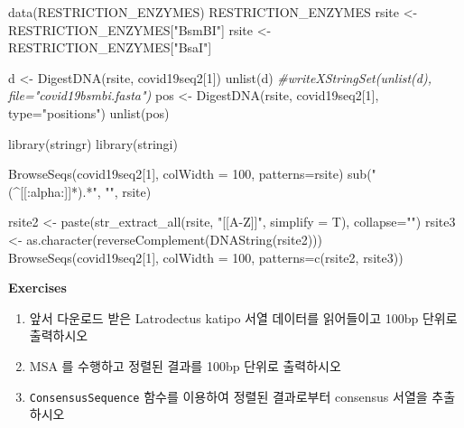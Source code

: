 \documentclass[
]{book}
\newenvironment{Shaded}{\begin{snugshade}}{\end{snugshade}}
\newcommand{\AttributeTok}[1]{\textcolor[rgb]{0.77,0.63,0.00}{#1}}
\newcommand{\CommentTok}[1]{\textcolor[rgb]{0.56,0.35,0.01}{\textit{#1}}}
\newcommand{\DecValTok}[1]{\textcolor[rgb]{0.00,0.00,0.81}{#1}}
\newcommand{\FunctionTok}[1]{\textcolor[rgb]{0.00,0.00,0.00}{#1}}
\newcommand{\NormalTok}[1]{#1}
\newcommand{\OtherTok}[1]{\textcolor[rgb]{0.56,0.35,0.01}{#1}}
\newcommand{\StringTok}[1]{\textcolor[rgb]{0.31,0.60,0.02}{#1}}
\begin{document}
\begin{Shaded}
\begin{Highlighting}[]

\FunctionTok{data}\NormalTok{(RESTRICTION\_ENZYMES)}
\NormalTok{RESTRICTION\_ENZYMES}
\NormalTok{rsite }\OtherTok{\textless{}{-}}\NormalTok{ RESTRICTION\_ENZYMES[}\StringTok{"BsmBI"}\NormalTok{]}
\NormalTok{rsite }\OtherTok{\textless{}{-}}\NormalTok{ RESTRICTION\_ENZYMES[}\StringTok{"BsaI"}\NormalTok{]}

\NormalTok{d }\OtherTok{\textless{}{-}} \FunctionTok{DigestDNA}\NormalTok{(rsite, covid19seq2[}\DecValTok{1}\NormalTok{])}
\FunctionTok{unlist}\NormalTok{(d)}
\CommentTok{\#writeXStringSet(unlist(d), file="covid19bsmbi.fasta")}
\NormalTok{pos }\OtherTok{\textless{}{-}} \FunctionTok{DigestDNA}\NormalTok{(rsite, covid19seq2[}\DecValTok{1}\NormalTok{], }\AttributeTok{type=}\StringTok{"positions"}\NormalTok{)}
\FunctionTok{unlist}\NormalTok{(pos)}


\FunctionTok{library}\NormalTok{(stringr)}
\FunctionTok{library}\NormalTok{(stringi)}


\FunctionTok{BrowseSeqs}\NormalTok{(covid19seq2[}\DecValTok{1}\NormalTok{], }\AttributeTok{colWidth =} \DecValTok{100}\NormalTok{, }\AttributeTok{patterns=}\NormalTok{rsite)}
\FunctionTok{sub}\NormalTok{(}\StringTok{"(\^{}[[:alpha:]]*).*"}\NormalTok{, }\StringTok{""}\NormalTok{, rsite)}

\NormalTok{rsite2 }\OtherTok{\textless{}{-}} \FunctionTok{paste}\NormalTok{(}\FunctionTok{str\_extract\_all}\NormalTok{(rsite, }\StringTok{"[[A{-}Z]]"}\NormalTok{, }\AttributeTok{simplify =}\NormalTok{ T), }\AttributeTok{collapse=}\StringTok{""}\NormalTok{)}
\NormalTok{rsite3 }\OtherTok{\textless{}{-}} \FunctionTok{as.character}\NormalTok{(}\FunctionTok{reverseComplement}\NormalTok{(}\FunctionTok{DNAString}\NormalTok{(rsite2)))}
\FunctionTok{BrowseSeqs}\NormalTok{(covid19seq2[}\DecValTok{1}\NormalTok{], }\AttributeTok{colWidth =} \DecValTok{100}\NormalTok{, }\AttributeTok{patterns=}\FunctionTok{c}\NormalTok{(rsite2, rsite3))}
\end{Highlighting}
\end{Shaded}

\textbf{Exercises }

\begin{enumerate}
\def\labelenumi{\arabic{enumi}.}
\item
  앞서 다운로드 받은 Latrodectus katipo 서열 데이터를 읽어들이고 100bp 단위로 출력하시오
\item
  MSA 를 수행하고 정렬된 결과를 100bp 단위로 출력하시오
\item
  \texttt{ConsensusSequence} 함수를 이용하여 정렬된 결과로부터 consensus 서열을 추출하시오
\end{enumerate}
\end{document}
